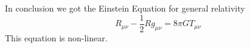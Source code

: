 In conclusion we got the Einstein Equation for general relativity
\begin{equation}
R_{\mu \nu } - \frac{1}{2} R g_{\mu \nu } = 8\pi G T_{\mu \nu }
\end{equation}
This equation is non-linear.

















